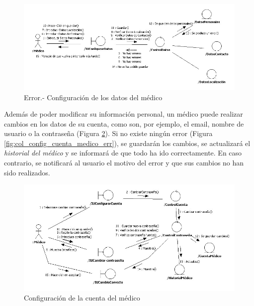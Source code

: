 \documentclass[a4paper,oneside,11pt]{book}
\begin{document}
			\bigskip
			\bigskip
			\bigskip
			\begin{figure}[H]
			  \centering
			    \includegraphics[width=16cm]{img/jpg/colaboraciones/3_ConfiguracionDatosMedicoError2.jpg}
			  \caption{Error.- Configuración de los datos del médico}
			  \label{fig:col_config_dat_medico_err2}
			\end{figure}
			
			\newpage
			
			Además de poder modificar su información personal, un médico puede realizar cambios en los datos de su cuenta, como son, por ejemplo, el email, nombre de usuario o la contraseña (Figura \ref{fig:col_config_cuenta_medico}). Si no existe ningún error (Figura \ref{fig:col_config_cuenta_medico_err}), se guardarán los cambios, se actualizará el \textit{historial del médico} y se informará de que todo ha ido correctamente. En caso contrario, se notificará al usuario el motivo del error y que sus cambios no han sido realizados.
			\begin{figure}[H]
			  \centering
			    \includegraphics[width=16cm]{img/jpg/colaboraciones/4_ConfiguracionCuentaMedico.jpg}
			  \caption{Configuración de la cuenta del médico}
			  \label{fig:col_config_cuenta_medico}
			\end{figure}
			
\end{document}
